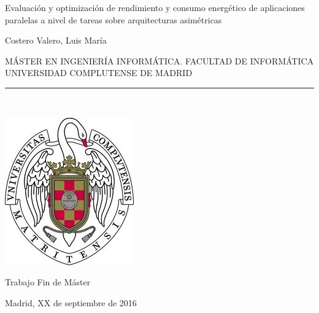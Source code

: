 \begin{center}

   \vspace{1cm}


   {\Large Evaluación y optimización de rendimiento y consumo energético de aplicaciones
	paralelas a nivel de tareas sobre arquitecturas asimétricas}\\

   \vspace{0.5cm}



   \vspace{0.5cm}



   {\large Costero Valero, Luis María}\\

   \vspace{0.5cm}

   MÁSTER EN INGENIERÍA INFORMÁTICA. FACULTAD DE INFORMÁTICA\\ 
   UNIVERSIDAD COMPLUTENSE DE MADRID \\

   \vspace{0.65cm}
   \rule{2in}{0.5pt}\\
   \vspace{0.85cm}

  \includegraphics[height=2.5in]{Figures/escudo.jpg}
  

   \vspace{0.5cm}
Trabajo Fin de Máster 

   \vspace{0.5cm}






  Madrid, XX de septiembre de 2016\\
   \vspace{1cm}

\end{center}

